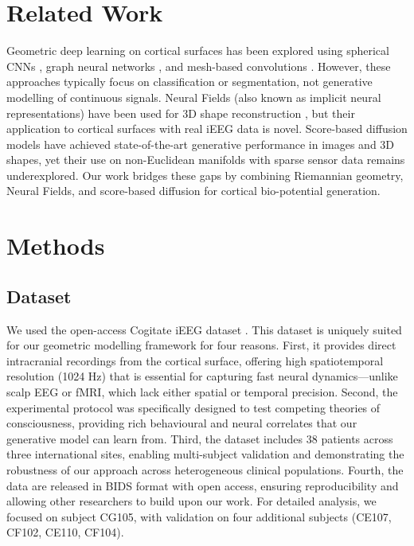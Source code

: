\documentclass[twocolumn]{article}
\begin{document}
	\section{Related Work}
	Geometric deep learning on cortical surfaces has been explored using spherical CNNs \cite{cohen2018spherical}, graph neural networks \cite{kipf2017semi}, and mesh-based convolutions \cite{ranjan2018generative}. However, these approaches typically focus on classification or segmentation, not generative modelling of continuous signals. Neural Fields (also known as implicit neural representations) have been used for 3D shape reconstruction \cite{park2019deepsdf, sitzmann2020}, but their application to cortical surfaces with real iEEG data is novel. Score-based diffusion models \cite{song2020denoising, ho2020denoising} have achieved state-of-the-art generative performance in images and 3D shapes, yet their use on non-Euclidean manifolds with sparse sensor data remains underexplored. Our work bridges these gaps by combining Riemannian geometry, Neural Fields, and score-based diffusion for cortical bio-potential generation.
	
	\section{Methods}
	
	\subsection{Dataset}
	We used the open-access Cogitate iEEG dataset \cite{seedat2025, cogitate2024}. This dataset is uniquely suited for our geometric modelling framework for four reasons. First, it provides direct intracranial recordings from the cortical surface, offering high spatiotemporal resolution (1024 Hz) that is essential for capturing fast neural dynamics---unlike scalp EEG or fMRI, which lack either spatial or temporal precision. Second, the experimental protocol was specifically designed to test competing theories of consciousness, providing rich behavioural and neural correlates that our generative model can learn from. Third, the dataset includes 38 patients across three international sites, enabling multi-subject validation and demonstrating the robustness of our approach across heterogeneous clinical populations. Fourth, the data are released in BIDS format \cite{gorgolewski2016} with open access, ensuring reproducibility and allowing other researchers to build upon our work. For detailed analysis, we focused on subject CG105, with validation on four additional subjects (CE107, CF102, CE110, CF104).
	
\end{document}
